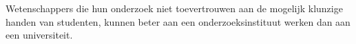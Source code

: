 \documentclass[10pt]{stellingen}
\begin{document}
\begin{stelling}
Wetenschappers die hun onderzoek niet toevertrouwen aan de mogelijk klunzige handen van studenten, kunnen beter aan een onderzoeksinstituut werken dan aan een universiteit.
\end{stelling}

\end{document}
